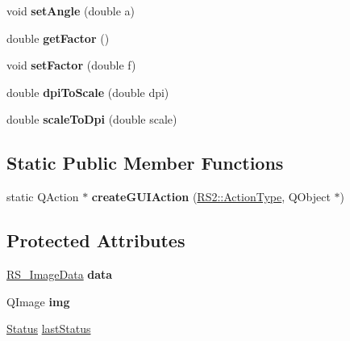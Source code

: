 \begin{DoxyCompactItemize}
\item 
\hypertarget{classRS__ActionDrawImage_aad22c711e2aac80c7a40b9bef0add37e}{void {\bfseries set\-Angle} (double a)}\label{classRS__ActionDrawImage_aad22c711e2aac80c7a40b9bef0add37e}

\item 
\hypertarget{classRS__ActionDrawImage_ad53da946ddbe479901b611519fcdf65a}{double {\bfseries get\-Factor} ()}\label{classRS__ActionDrawImage_ad53da946ddbe479901b611519fcdf65a}

\item 
\hypertarget{classRS__ActionDrawImage_afb4616a315ec841666a6ecf73f9d0e2c}{void {\bfseries set\-Factor} (double f)}\label{classRS__ActionDrawImage_afb4616a315ec841666a6ecf73f9d0e2c}

\item 
\hypertarget{classRS__ActionDrawImage_a37d922451e22cf6259f1dc60b7667963}{double {\bfseries dpi\-To\-Scale} (double dpi)}\label{classRS__ActionDrawImage_a37d922451e22cf6259f1dc60b7667963}

\item 
\hypertarget{classRS__ActionDrawImage_a7986f7a0fd7dcc777fe78f587ad51cea}{double {\bfseries scale\-To\-Dpi} (double scale)}\label{classRS__ActionDrawImage_a7986f7a0fd7dcc777fe78f587ad51cea}

\end{DoxyCompactItemize}
\subsection*{Static Public Member Functions}
\begin{DoxyCompactItemize}
\item 
\hypertarget{classRS__ActionDrawImage_acc5ec69ea6278fe2c48887c8509791ff}{static Q\-Action $\ast$ {\bfseries create\-G\-U\-I\-Action} (\hyperlink{classRS2_afe3523e0bc41fd637b892321cfc4b9d7}{R\-S2\-::\-Action\-Type}, Q\-Object $\ast$)}\label{classRS__ActionDrawImage_acc5ec69ea6278fe2c48887c8509791ff}

\end{DoxyCompactItemize}
\subsection*{Protected Attributes}
\begin{DoxyCompactItemize}
\item 
\hypertarget{classRS__ActionDrawImage_aa9fc004c77b596b55715c6fa7dbc50ef}{\hyperlink{classRS__ImageData}{R\-S\-\_\-\-Image\-Data} {\bfseries data}}\label{classRS__ActionDrawImage_aa9fc004c77b596b55715c6fa7dbc50ef}

\item 
\hypertarget{classRS__ActionDrawImage_a399408a924a706afa71df81be2642297}{Q\-Image {\bfseries img}}\label{classRS__ActionDrawImage_a399408a924a706afa71df81be2642297}

\item 
\hyperlink{classRS__ActionDrawImage_ab906c07719d324614762be6778aa8b8b}{Status} \hyperlink{classRS__ActionDrawImage_a204732dc8fa419a32c597341728889ff}{last\-Status}
\end{DoxyCompactItemize}
